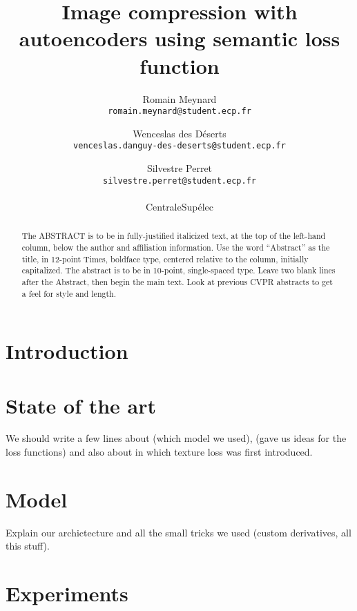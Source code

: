 \documentclass[10pt,twocolumn,letterpaper]{article}
\begin{document}
\title{Image compression with autoencoders using semantic loss function}

\author{Romain Meynard\\
{\tt\small romain.meynard@student.ecp.fr}
\and
Wenceslas des Déserts \\
{\tt\small venceslas.danguy-des-deserts@student.ecp.fr}
\and
Silvestre Perret \\
{\tt\small silvestre.perret@student.ecp.fr}	 \\
\\
CentraleSupélec\\
}

\maketitle

\begin{abstract}
   The ABSTRACT is to be in fully-justified italicized text, at the top
   of the left-hand column, below the author and affiliation
   information. Use the word ``Abstract'' as the title, in 12-point
   Times, boldface type, centered relative to the column, initially
   capitalized. The abstract is to be in 10-point, single-spaced type.
   Leave two blank lines after the Abstract, then begin the main text.
   Look at previous CVPR abstracts to get a feel for style and length.
\end{abstract}

\section{Introduction}

\section{State of the art}
We should write a few lines about \cite{theis_lossy_2017} (which model we used), \cite{sajjadi_enhancenet:_2016} (gave us ideas for the loss functions) and also about \cite{gatys_texture_2015} in which texture loss was first introduced.

\section{Model}

Explain our archictecture and all the small tricks we used (custom derivatives, all this stuff). 

\section{Experiments}
\end{document}
